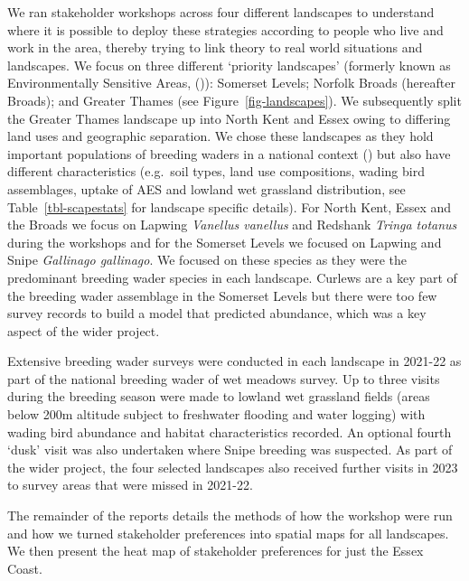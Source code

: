 \documentclass[
  12pt,
  letterpaper,
  DIV=11,
  numbers=noendperiod]{scrartcl}
\begin{document}
We ran stakeholder workshops across four different landscapes to
understand where it is possible to deploy these strategies according to
people who live and work in the area, thereby trying to link theory to
real world situations and landscapes. We focus on three different
`priority landscapes' (formerly known as Environmentally Sensitive
Areas, ()): Somerset
Levels; Norfolk Broads (hereafter Broads); and Greater Thames (see
Figure~\ref{fig-landscapes}). We subsequently split the Greater Thames
landscape up into North Kent and Essex owing to differing land uses and
geographic separation. We chose these landscapes as they hold important
populations of breeding waders in a national context
() but also have different
characteristics (e.g.~soil types, land use compositions, wading bird
assemblages, uptake of AES and lowland wet grassland distribution, see
Table~\ref{tbl-scapestats} for landscape specific details). For North
Kent, Essex and the Broads we focus on Lapwing \emph{Vanellus vanellus}
and Redshank \emph{Tringa totanus} during the workshops and for the
Somerset Levels we focused on Lapwing and Snipe \emph{Gallinago
gallinago}. We focused on these species as they were the predominant
breeding wader species in each landscape. Curlews are a key part of the
breeding wader assemblage in the Somerset Levels but there were too few
survey records to build a model that predicted abundance, which was a
key aspect of the wider project.

Extensive breeding wader surveys were conducted in each landscape in
2021-22 as part of the national breeding wader of wet meadows survey. Up
to three visits during the breeding season were made to lowland wet
grassland fields (areas below 200m altitude subject to freshwater
flooding and water logging) with wading bird abundance and habitat
characteristics recorded. An optional fourth `dusk' visit was also
undertaken where Snipe breeding was suspected. As part of the wider
project, the four selected landscapes also received further visits in
2023 to survey areas that were missed in 2021-22.

The remainder of the reports details the methods of how the workshop
were run and how we turned stakeholder preferences into spatial maps for
all landscapes. We then present the heat map of stakeholder preferences
for just the Essex Coast.
\end{document}
